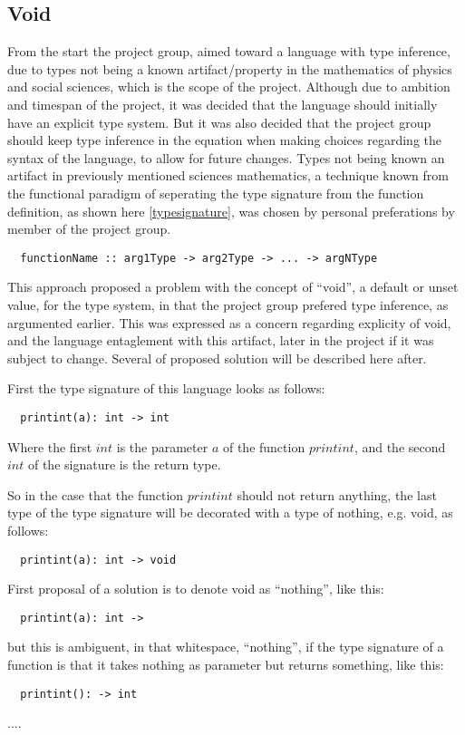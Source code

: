 \subsection{Void}
\label{sub:void}

From the start the project group, aimed toward a language with type inference, due to types not being a known artifact/property in the mathematics of physics and social sciences, which is the scope of the project. Although due to ambition and timespan of the project, it was decided that the language should initially have an explicit type system. But it was also decided that the project group should keep type inference in the equation when making choices regarding the syntax of the language, to allow for future changes. %
Types not being known an artifact in previously mentioned sciences mathematics, a technique known from the functional paradigm of seperating the type signature from the function definition, as shown here \cref{typesignature}, was chosen by personal preferations by member of the project group.

\begin{verbatim}
  functionName :: arg1Type -> arg2Type -> ... -> argNType
\end{verbatim}
\label{typesignature}

This approach proposed a problem with the concept of \enquote{void}, a default or unset value, for the type system, in that the project group prefered type inference, as argumented earlier. This was expressed as a concern regarding explicity of void, and the language entaglement with this artifact, later in the project if it was subject to change. Several of proposed solution will be described here after.

First the type signature of this language looks as follows:
\begin{verbatim}
  printint(a): int -> int
\end{verbatim}
Where the first $int$ is the parameter $a$ of the function $printint$, and the second $int$ of the signature is the return type.

So in the case that the function $printint$ should not return anything, the last type of the type signature will be decorated with a type of nothing, e.g. void, as follows:
\begin{verbatim}
  printint(a): int -> void
\end{verbatim}

First proposal of a solution is to denote void as \enquote{nothing}, like this:
\begin{verbatim}
  printint(a): int ->
\end{verbatim}
but this is ambiguent, in that whitespace, \enquote{nothing}, if the type signature of a function is that it takes nothing as parameter but returns something, like this:
\begin{verbatim}
  printint(): -> int
\end{verbatim}
.... %

